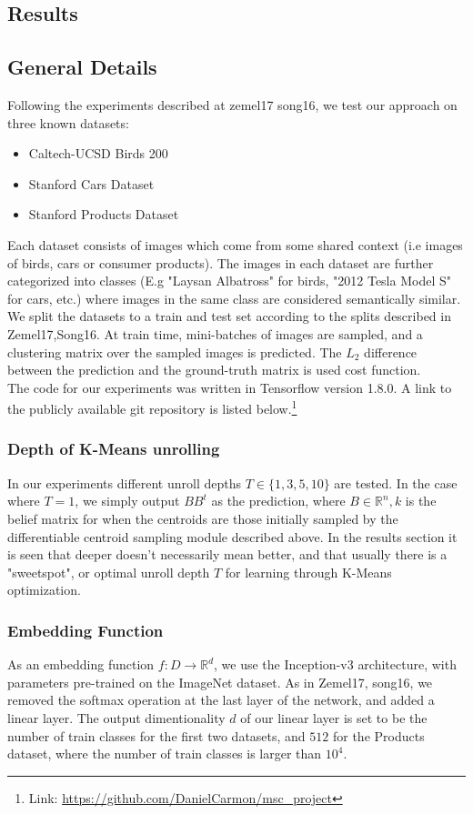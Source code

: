 \subsection{Results}
\subsection{General Details}
Following the experiments described at zemel17 song16, we test our approach on three known datasets:\\
\begin{itemize}
\item Caltech-UCSD Birds 200 \cite{WahCUB_200_2011}
\item Stanford Cars Dataset
\item Stanford Products Dataset
\end{itemize}
Each dataset consists of images which come from some shared context (i.e images of birds, cars or consumer products). The images in each dataset are further categorized into classes (E.g "Laysan Albatross" for birds, "2012 Tesla Model S" for cars, etc.) where images in the same class are considered semantically similar.
We split the datasets to a train and test set according to the splits described in Zemel17,Song16. At train time, mini-batches of images are sampled, and a clustering matrix over the sampled images is predicted. The $L_2$ difference between the prediction and the ground-truth matrix is used cost function.\\
The code for our experiments was written in Tensorflow \cite{greenwade93} version 1.8.0. A link to the publicly available git repository is listed below.\footnote{Link: \url{https://github.com/DanielCarmon/msc_project}}
\subsubsection{Depth of K-Means unrolling}
In our experiments different unroll depths $T\in\{1,3,5,10\}$ are tested. In the case where $T=1$, we simply output $BB^t$ as the prediction, where $B\in\mathbb{R}^n,k$ is the belief matrix for when the centroids are those initially sampled by the differentiable centroid sampling module described above. 
In the results section it is seen that deeper doesn't necessarily mean better, and that usually there is a "sweetspot", or optimal unroll depth $T$ for learning through K-Means optimization.

\subsubsection{Embedding Function}
As an embedding function $f:D\rightarrow \mathbb{R}^d$, we use the Inception-v3 \cite{greenwade93} architecture, with parameters pre-trained on the ImageNet\cite{greenwade93} dataset. As in Zemel17, song16, we removed the softmax operation at the last layer of the network, and added a linear layer. The output dimentionality $d$ of our linear layer is set to be the number of train classes for the first two datasets, and $512$ for the Products dataset, where the number of train classes is larger than $10^4$.\\

